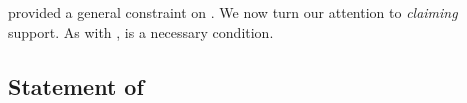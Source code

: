 


\section{}
\label{sec:ideaCS}

\begin{note}
  \ideaS{} provided a general constraint on \support{}.
  We now turn our attention to \emph{claiming} support.
  As with \ideaS{}, \ideaCS{} is a necessary condition.
\end{note}

\subsection{Statement of \ideaCS{}}

